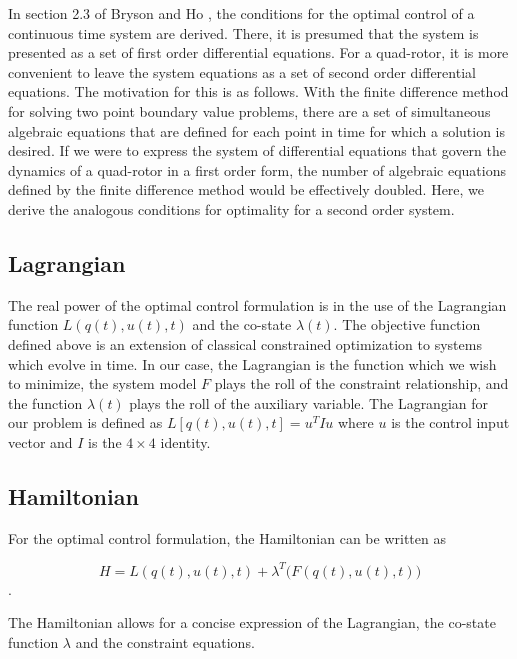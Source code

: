     In section 2.3 of Bryson and Ho \cite{BrysonHo69}, the conditions for the optimal control of a continuous time system are derived. There, it is presumed that the system is  presented as a set of first order differential equations. For a quad-rotor, it is more convenient to leave the system equations as a set of second order differential equations. The motivation for this is as follows. With the finite difference method for solving two point boundary value problems, there are a set of simultaneous algebraic equations that are defined for each point in time for which a solution is desired. If we were to express the system of differential equations that govern the dynamics of a quad-rotor in a first order form, the number of algebraic equations defined by the finite difference method would be effectively doubled. Here, we derive the analogous conditions for optimality for a second order system.

\subsection{Lagrangian}

The real power of the optimal control formulation is in the use of the Lagrangian function $L(q(t),u(t),t)$ and the co-state $\lambda(t)$. The objective function defined above is an extension of classical constrained optimization to systems which evolve in time. In our case, the Lagrangian is the function which we wish to minimize, the system model $F$ plays the roll of the constraint relationship, and the function $\lambda(t)$ plays the roll of the auxiliary variable. The Lagrangian for our problem is defined as $ L[q(t),u(t),t] = u^T I u $ where $u$ is the control input vector and $I$ is the $4\times4$ identity.



\subsection{Hamiltonian}

For the optimal control formulation, the Hamiltonian can be written as 

\begin{equation}
    H = L(q(t),u(t),t) + \lambda^T \big( F(q(t),u(t),t) \big)
\end{equation}.

The Hamiltonian allows for a concise expression of the Lagrangian, the co-state function $\lambda$ and the constraint equations.


